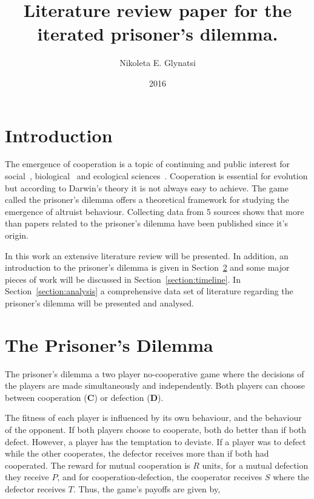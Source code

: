 \documentclass{article}
\title{Literature review paper for the iterated prisoner's dilemma.}
\author{Nikoleta E. Glynatsi}
\date{2016}
\newcommand{\totalarticles}{}
\begin{document}
\maketitle

\section{Introduction}\label{section:introduction}

The emergence of cooperation is a topic of continuing and public interest
for social~\cite{capraro2014, gracia2012},
biological~\cite{Douglas2011}
and ecological sciences~\cite{Godfray1992,Krama2012,Milinski1987,Wilkinson1984}.
Cooperation is essential for evolution but according to Darwin’s theory 
it is not always easy to achieve. The game called the prisoner's
dilemma offers a theoretical framework for studying the emergence of
altruist behaviour. Collecting data from 5 sources shows that more than \totalarticles
papers related to the prisoner's dilemma have been published since it's origin.

In this work an extensive literature review will be presented. In addition, 
an introduction to the prisoner's dilemma is given in Section~\ref{section:prisoners_dilemma}
and some major pieces of work will be discussed in Section~\ref{section:timeline}.
In Section~\ref{section:analysis} a comprehensive data set of literature
regarding the prisoner's dilemma will be presented and analysed.

\section{The Prisoner's Dilemma}\label{section:prisoners_dilemma}

The prisoner's dilemma a two player no-cooperative game where the decisions
of the players are made simultaneously and independently. Both players can
choose between cooperation (\textbf{C}) or defection (\textbf{D}).

The fitness of each player is influenced by its own behaviour, and the behaviour
of the opponent. If both players choose to cooperate, both do better
than if both defect. However, a player has the temptation to deviate. If a
player was to defect while the other cooperates, the defector receives
more than if both had cooperated. The reward for mutual cooperation is \(R\)
units, for a mutual defection they receive \(P\), and for cooperation-defection,
the cooperator receives \(S\) where the defector receives \(T\). Thus, the game's
payoffs are given by,
\end{document}
